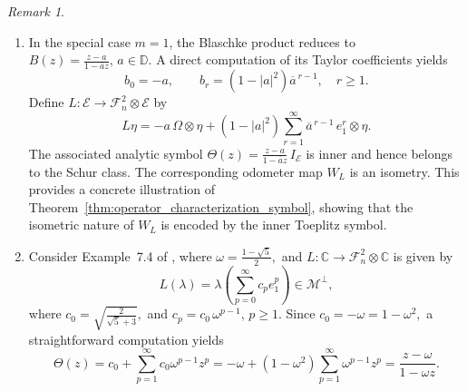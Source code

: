 \documentclass[12pt]{amsart}
\theoremstyle{definition}
\theoremstyle{remark}
\newtheorem{remark}[theorem]{Remark}
\def \D{\mathbb{D}}
\newcommand{\cle}{\mathcal{E}}
\newcommand{\clm}{\mathcal{M}}
\newcommand{\clf}{\mathcal{F}}
\numberwithin{equation}{section}
\begin{document}
\begin{remark}

\begin{enumerate}
\item In the special case $m=1$, the Blaschke product reduces to $B(z)=\frac{z-a}{1-\overline a z}, \, a\in\D.$
A direct computation of its Taylor coefficients yields
\[
b_0=-a, \qquad b_r=(1-|a|^2)\overline a^{\,r-1}, \quad r\ge1.
\]
Define $L:\cle\to \clf_n^2\otimes \cle$ by
\[
L\eta=-a\,\Omega\otimes \eta+
(1-|a|^2)\sum_{r=1}^\infty \overline a^{\,r-1}\, e_1^{r}\otimes \eta.
\]
The associated analytic symbol $\Theta(z)=\frac{z-a}{1-\overline a z}\,I_{\cle}$ is inner and hence belongs to the Schur class. The corresponding odometer map $W_L$ is an isometry.
This provides a concrete illustration of Theorem~\ref{thm:operator_characterization_symbol}, showing that the isometric nature of $W_L$ is encoded by the inner Toeplitz symbol.
 

\item Consider Example~7.4 of \cite{mansi2025}, where $\omega=\frac{1-\sqrt5}{2},$ and
\(L:\mathbb C\to \clf_n^2\otimes \mathbb C\) is given by
\[
L(\lambda)=\lambda (\sum_{p=0}^{\infty} c_p e_1^p)\in \clm^\perp,
\]
where $c_0=\sqrt{\frac{2}{\sqrt5+3}},$ and $
c_p=c_0\,\omega^{p-1},\, p\geq 1.$
Since $c_0=-\omega=1-\omega^2,$
a straightforward computation yields
\[
\Theta(z)
=
c_0+\sum_{p=1}^{\infty}c_0\omega^{p-1}z^p
=
-\omega+(1-\omega^2)\sum_{p=1}^{\infty}\omega^{p-1}z^p
=
\frac{z-\omega}{1-\omega z}.
\]
\end{enumerate}
\end{remark}
\end{document}
